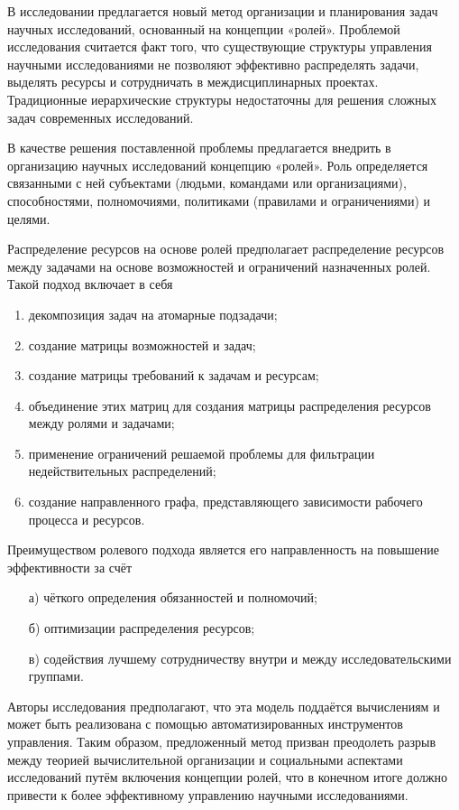 В исследовании \cite{china} предлагается новый метод организации и планирования задач научных исследований, основанный на концепции «ролей». Проблемой исследования считается факт того, что существующие структуры управления научными исследованиями не позволяют эффективно распределять задачи, выделять ресурсы и сотрудничать в междисциплинарных проектах. Традиционные иерархические структуры недостаточны для решения сложных задач современных исследований.

В качестве решения поставленной проблемы предлагается внедрить в организацию научных исследований концепцию «ролей». Роль определяется связанными с ней субъектами (людьми, командами или организациями), способностями, полномочиями, политиками (правилами и ограничениями) и целями.

Распределение ресурсов на основе ролей предполагает распределение ресурсов между задачами на основе возможностей и ограничений назначенных ролей. Такой подход включает в себя
\begin{enumerate}[label*=\arabic*)]
	\item декомпозиция задач на атомарные подзадачи;
	\item создание матрицы возможностей и задач;
	\item создание матрицы требований к задачам и ресурсам;
	\item объединение этих матриц для создания матрицы распределения ресурсов между ролями и задачами;
	\item применение ограничений решаемой проблемы для фильтрации недействительных распределений;
	\item создание направленного графа, представляющего зависимости рабочего процесса и ресурсов.
\end{enumerate}

Преимуществом ролевого подхода является его направленность на повышение эффективности за счёт
\begin{enumerate}
	\item[а)]  чёткого определения обязанностей и полномочий;
	\item[б)]  оптимизации распределения ресурсов;
	\item[в)]  содействия лучшему сотрудничеству внутри и между исследовательскими группами.
\end{enumerate}

Авторы исследования \cite{china} предполагают, что эта модель поддаётся вычислениям и может быть реализована с помощью автоматизированных инструментов управления. Таким образом, предложенный метод призван преодолеть разрыв между теорией вычислительной организации и социальными аспектами исследований путём включения концепции ролей, что в конечном итоге должно привести к более эффективному управлению научными исследованиями.
